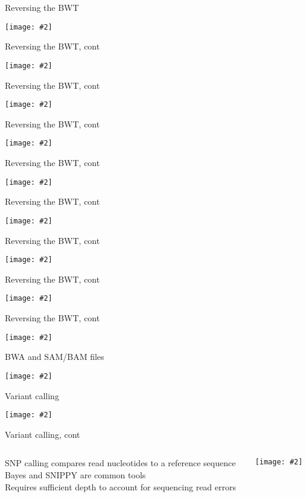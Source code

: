 \documentclass{beamer}
\renewcommand{\c}[1]{\begin{center}#1\end{center}}
\newcommand{\gr}[2][.95]{\c{\texttt{[image: \#2]}}}
\begin{document}
\begin{frame}{Reversing the BWT}
\gr{l6_figs/s28_rev1.png}
\end{frame}

\begin{frame}{Reversing the BWT, cont}
\gr{l6_figs/s29_rev2.png}
\end{frame}

\begin{frame}{Reversing the BWT, cont}
\gr{l6_figs/s30_rev3.png}
\end{frame}

\begin{frame}{Reversing the BWT, cont}
\gr{l6_figs/s31_rev4.png}
\end{frame}

\begin{frame}{Reversing the BWT, cont}
\gr{l6_figs/s32_rev5.png}
\end{frame}

\begin{frame}{Reversing the BWT, cont}
\gr{l6_figs/s33_rev6.png}
\end{frame}

\begin{frame}{Reversing the BWT, cont}
\gr{l6_figs/s34_rev7.png}
\end{frame}

\begin{frame}{Reversing the BWT, cont}
\gr{l6_figs/s35_rev8.png}
\end{frame}

\begin{frame}{Reversing the BWT, cont}
\gr{l6_figs/s36_rev9.png}
\end{frame}

\begin{frame}{BWA and SAM/BAM files}
\gr{l6_figs/s37_samfile.png}
\end{frame}

\begin{frame}{Variant calling}
\gr{l6_figs/s38_variant_calling.png}
\end{frame}

\begin{frame}{Variant calling, cont}
    \begin{columns}
        \begin{column}{0.6\textwidth}
            SNP calling compares read nucleotides to a reference sequence\\
            \bigskip
            Bayes and SNIPPY are common tools\\
            \bigskip
            Requires sufficient depth to account for sequencing read errors
        \end{column}
        \begin{column}{0.4\textwidth}
            \gr{l6_figs/s39_snippy.png}
        \end{column}
    \end{columns}
\end{frame}
\end{document}
